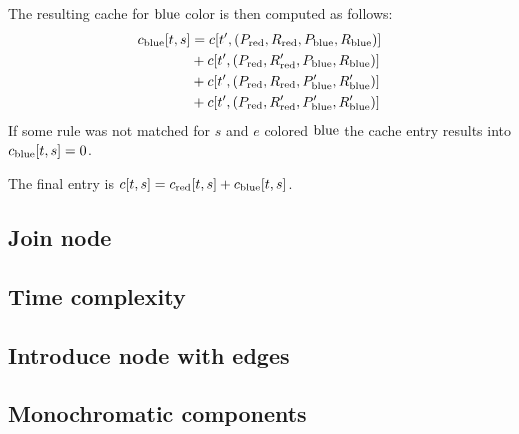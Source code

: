 The resulting cache for \( \text{blue} \) color is then computed as follows:
%
\begin{align}
	c_{\text{blue}}[t, s] & = c[t^\prime, (P_{\text{red}}, R_{\text{red}}, P_{\text{blue}}, R_{\text{blue}})]   \notag                      \\
	              & + c[t^\prime, (P_{\text{red}}, R_{\text{red}}^\prime, P_{\text{blue}}, R_{\text{blue}})]   \notag               \\
	              & + c[t^\prime, (P_{\text{red}}, R_{\text{red}}, P_{\text{blue}}^\prime, R_{\text{blue}}^\prime)]   \notag        \\
	              & + c[t^\prime, (P_{\text{red}}, R_{\text{red}}^\prime, P_{\text{blue}}^\prime, R_{\text{blue}}^\prime)]   \notag
\end{align}
%
If some rule was not matched for \( s \) and \( e \) colored \( \text{blue} \)
the cache entry results into \( c_{\text{blue}}[t, s] = 0 \).

The final entry is \( c[t, s] = c_{\text{red}}[t, s] + c_{\text{blue}}[t, s] \).

\subsection{Join node}
\subsection{Time complexity}
\subsection{Introduce node with edges}
\subsection{Monochromatic components}

